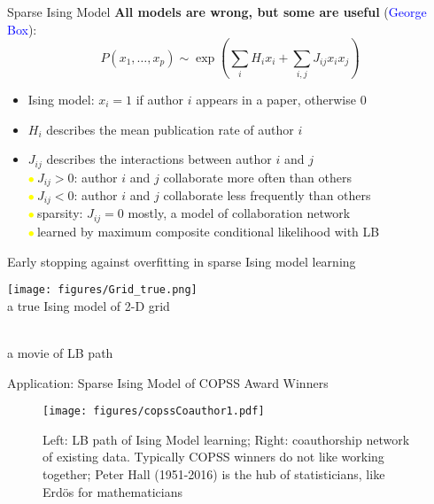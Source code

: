 \documentclass[slidestop,compress,9pt,epsfig,color]{beamer}
\theoremstyle{example}
\providecommand{\subitem}{\\ \textcolor{yellow}{$\bullet\ $}}
\begin{document}
\begin{frame}{Sparse Ising Model}
\textbf{All models are wrong, but some are useful} (\textcolor{blue}{George Box}):
 $$P(x_1, \ldots, x_p) \sim \exp \left( \sum_i H_i x_i + \sum_{i,j} J_{ij} x_i x_j \right) $$
\begin{itemize}
\item Ising model: $x_i=1$ if author $i$ appears in a paper, otherwise 0
\item $H_{i}$ describes the mean publication rate of author $i$  
\item $J_{ij}$ describes the interactions between author $i$ and $j$
\subitem $J_{ij}>0$: author $i$ and $j$ collaborate more often than others 
\subitem $J_{ij}<0$: author $i$ and $j$ collaborate less frequently than others 
\subitem sparsity: $J_{ij}=0$ mostly, a model of collaboration network
\subitem learned by maximum composite conditional likelihood with LB
\end{itemize}
\end{frame}

\begin{frame}{Early stopping against overfitting in sparse Ising model learning}
\begin{center}
      \begin{minipage}[b]{0.4\textwidth}
       \centering
      \texttt{[image: figures/Grid\_true.png]} \\
      a true Ising model of 2-D grid
     \end{minipage}
      \begin{minipage}[b]{0.4\textwidth}
       \centering
	 \\
      a movie of LB path
     \end{minipage}
\end{center}
\end{frame}

\begin{frame}{Application: Sparse Ising Model of COPSS Award Winners}
\begin{figure}[!h]
\texttt{[image: figures/copssCoauthor1.pdf]}
\caption{Left: LB path of Ising Model learning; Right: coauthorship network of existing data. Typically COPSS winners do not like working together; Peter Hall (1951-2016) is the hub of statisticians, like Erd\"{o}s for mathematicians}
\end{figure}
\end{frame}
\end{document}
